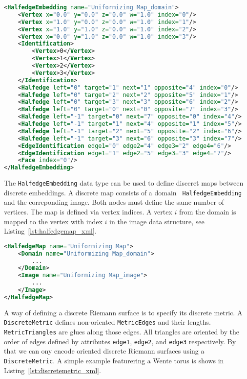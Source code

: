 \documentclass[Thesis.tex]{subfiles}
\begin{document}
\begin{lstlisting}[label=lst:halfedge_xml, caption={A torus given as {\tt HalfedegeEmbedding}
with identified edge pairs and vertices.}, numbers=none, language=XML, captionpos=b]
<HalfedgeEmbedding name="Uniformizing Map_domain">
	<Vertex x="0.0" y="0.0" z="0.0" w="1.0" index="0"/>
	<Vertex x="1.0" y="0.0" z="0.0" w="1.0" index="1"/>
	<Vertex x="1.0" y="1.0" z="0.0" w="1.0" index="2"/>
	<Vertex x="0.0" y="1.0" z="0.0" w="1.0" index="3"/>
	<Identification>
		<Vertex>0</Vertex>
		<Vertex>1</Vertex>
		<Vertex>2</Vertex>
		<Vertex>3</Vertex>
	</Identification>
	<Halfedge left="0" target="1" next="1" opposite="4" index="0"/>
	<Halfedge left="0" target="2" next="2" opposite="5" index="1"/>
	<Halfedge left="0" target="3" next="3" opposite="6" index="2"/>
	<Halfedge left="0" target="0" next="0" opposite="7" index="3"/>
	<Halfedge left="-1" target="0" next="7" opposite="0" index="4"/>
	<Halfedge left="-1" target="1" next="4" opposite="1" index="5"/>
	<Halfedge left="-1" target="2" next="5" opposite="2" index="6"/>
	<Halfedge left="-1" target="3" next="6" opposite="3" index="7"/>
	<EdgeIdentification edge1="0" edge2="4" edge3="2" edge4="6"/>
	<EdgeIdentification edge1="1" edge2="5" edge3="3" edge4="7"/>
	<Face index="0"/>
</HalfedgeEmbedding>
\end{lstlisting}

The {\tt HalfedgeEmbedding} data type can be used to define disceret maps
between discrete embeddings. A discrete map consists of a domain {\tt
HalfedgeEmbedding} and the correponding image. Both nodes must define the same
number of vertices. The map is defined via vertex indices. A vertex $i$ from
the domain is mapped to the vertex with index $i$ in the image data structure,
see Listing~\ref{lst:halfedgemap_xml}.

\begin{lstlisting}[label=lst:halfedgemap_xml, caption={A discrete map is given by a pair of {\tt HalfedgeEmbedding}s, the {\tt Domain} and {\tt Image} of the map. Both are of type {\tt HalfedgeEmbedding}.}, numbers=none, language=XML, captionpos=b]
<HalfedgeMap name="Uniformizing Map">
	<Domain name="Uniformizing Map_domain">
		...
	</Domain>
	<Image name="Uniformizing Map_image">
		...
	</Image>
</HalfedgeMap>
\end{lstlisting}

A way of defining a discrete Riemann surface is to specify its discrete metric.
A {\tt DiscreteMetric} defines non-oriented {\tt MetricEdges} and their
lengths. {\tt MetricTriangles} are glues along those edges. All triangles are
oriented by the order of edges defined by attributes {\tt edge1}, {\tt edge2},
and {\tt edge3} respectively. By that we can ony encode oriented discrete
Riemann surfaces using a {\tt DiscreteMetric}.  A simple example featurering a
Wente torus is shows in Listing~\ref{lst:discretemetric_xml}.
\end{document}
